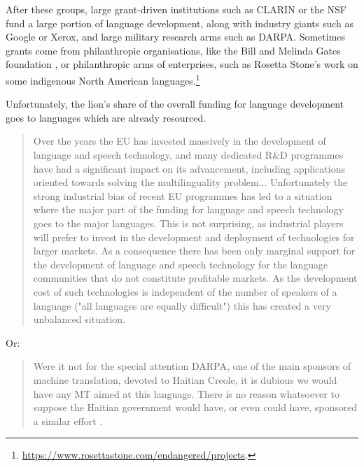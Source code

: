 After these groups, large grant-driven institutions such as CLARIN or the NSF fund a large portion of language development, along with industry giants such as Google or Xerox, and large military research arms such as DARPA. Sometimes grants come from philanthropic organisations, like the Bill and Melinda Gates foundation \citep{penfield2006technology}, or philanthropic arms of enterprises, such as Rosetta Stone's work on some indigenous North American languages.\footnote{\href{https://www.rosettastone.com/endangered/projects}{https://www.rosettastone.com/endangered/projects}. }

Unfortunately, the lion's share of the overall funding for language development goes to languages which are already resourced.

\begin{quote}
Over the years the EU has invested massively in the development of language and speech technology, and many dedicated R\&D programmes have had a significant impact on its advancement, including applications oriented towards solving the multilinguality problem... Unfortunately the strong industrial bias of recent EU programmes has led to a situation where the major part of the funding for language and speech technology goes to the major languages. This is not surprising, as industrial players will prefer to invest in the development and deployment of technologies for larger markets. As a consequence there has been only marginal support for the development of language and speech technology for the language communities that do not constitute profitable markets. As the development cost of such technologies is independent of the number of speakers of a language ("all languages are equally difficult") this has created a very unbalanced situation. \citep{krauwer2006strengthening}
\end{quote}

Or:

\begin{quote}
Were it not for the special attention DARPA, one of the main sponsors of machine translation, devoted to Haitian Creole, it is dubious we would have any MT aimed at this language. There is no reason whatsoever to suppose the Haitian government would have, or even could have, sponsored a similar effort \citep{spice}. \citep[9]{kornai2013digital}
\end{quote}

